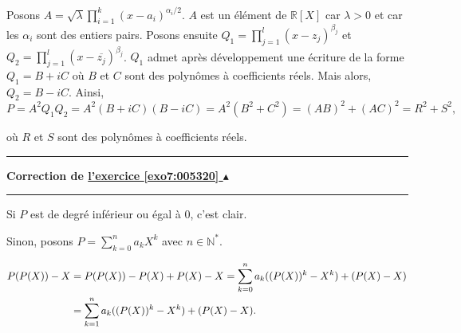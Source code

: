 \documentclass[11pt,a4paper]{article}
\newcommand{\Nn}{\mathbb{N}} \newcommand{\N}{\mathbb{N}}
\newcommand{\Rr}{\mathbb{R}} \newcommand{\R}{\mathbb{R}}
\newcounter{exo}
\newcommand{\correction}[1]{\hypertarget{cor7:#1}{}\label{cor7:#1}{\bf Correction de \hyperlink{exo7:#1}{l'exercice \ref{exo7:#1} $\blacktriangle$}}\vspace{1mm}\hrule\vspace{1mm}}
\newcommand{\fincorrection}{\vspace{1mm}\hrule\vspace*{7mm}}
\begin{document}
Posons $A=\sqrt{\lambda}\prod_{i=1}^{k}(x-a_i)^{\alpha_i/2}$. $A$ est un élément de $\Rr[X]$ car $\lambda>0$ et car les $\alpha_i$ sont des entiers pairs. Posons ensuite $Q_1=\prod_{j=1}^{l}(x-z_j)^{\beta_j}$ et $Q_2=\prod_{j=1}^{l}(x-\overline{z_j})^{\beta_j}$. $Q_1$ admet après développement une écriture de la forme $Q_1=B+iC$ où $B$ et $C$ sont des polynômes à coefficients réels. Mais alors, $Q_2=B-iC$. Ainsi, $$P=A^2Q_1Q_2=A^2(B+iC)(B-iC)=A^2(B^2+C^2)=(AB)^2+(AC)^2=R^2+S^2,$$

où $R$ et $S$ sont des polynômes à coefficients réels.
\fincorrection
\correction{005320}
Si $P$ est de degré inférieur ou égal à $0$, c'est clair.

Sinon, posons $P=\sum_{k=0}^{n}a_kX^k$ avec $n\in\Nn^*$.

\begin{align*}\ensuremath
P(P(X))-X&=P(P(X))-P(X)+P(X)-X=\sum_{k=0}^{n}a_k((P(X))^k-X^k)+(P(X)-X)\\
 &=\sum_{k=1}^{n}a_k((P(X))^k-X^k)+(P(X)-X).
\end{align*}
\end{document}
